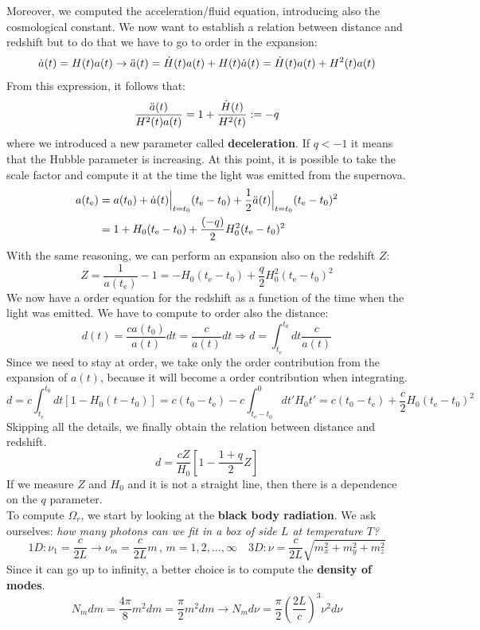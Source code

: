 \documentclass[10.75pt,a4paper,openright,bottom=2cm]{article}
\begin{document}
Moreover, we computed the acceleration/fluid equation, introducing also the cosmological constant. We now want to establish a relation between distance and redshift but to do that we have to go to  order in the expansion:
\[
\Dot{a}(t)=H(t)a(t)\to\Ddot{a}(t)=\Dot{H}(t)a(t)+H(t)\Dot{a}(t)=\Dot{H}(t)a(t)+H^2(t)a(t)
\]
From this expression, it follows that:
\[
\frac{\Ddot{a}(t)}{H^2(t)a(t)}=1+\frac{\Dot{H}(t)}{H^2(t)}:=-q
\]
where we introduced a new parameter called \textbf{deceleration}. If $q<-1$ it means that the Hubble parameter is increasing. At this point, it is possible to take the scale factor and compute it at the time the light was emitted from the supernova.
\[
\begin{aligned}
a(t_{\text{e}})&=a(t_0)+\Dot{a}(t)\Bigr|_{\substack{t=t_0}}(t_{\text{e}}-t_0)+\frac{1}{2}\Ddot{a}(t)\Bigr|_{\substack{t=t_0}}(t_{\text{e}}-t_0)^2\\
&=1+H_0(t_{\text{e}}-t_0)+\frac{(-q)}{2}H_0^2(t_{\text{e}}-t_0)^2
\end{aligned}
\]
With the same reasoning, we can perform an expansion also on the redshift $Z$:
\[
Z=\frac{1}{a(t_{\text{e}})}-1=-H_0(t_{\text{e}}-t_0)+\frac{q}{2}H_0^2(t_{\text{e}}-t_0)^2
\]
We now have a  order equation for the redshift as a function of the time when the light was emitted. We have to compute to  order also the distance:
\[
d(t)=\frac{ca(t_0)}{a(t)}dt=\frac{c}{a(t)}dt\Rightarrow d=\int_{t_{\text{e}}}^{t_0}dt\frac{c}{a(t)}
\]
Since we need to stay at  order, we take only the  order contribution from the expansion of $a(t)$, because it will become a  order contribution when integrating.
\[
d=c\int_{t_{\text{e}}}^{t_0}dt[1-H_0(t-t_0)]=c(t_0-t_{\text{e}})-c\int_{t_{\text{e}}-t_0}^{0}dt'H_0t'=c(t_0-t_{\text{e}})+\frac{c}{2}H_0(t_{\text{e}}-t_0)^2
\]
Skipping all the details, we finally obtain the relation between distance and redshift.
\[
d=\frac{cZ}{H_0}\left[1-\frac{1+q}{2}Z\right]
\]
If we measure $Z$ and $H_0$ and it is not a straight line, then there is a dependence on the $q$ parameter.\\
To compute $\Omega_r$, we start by looking at the \textbf{black body radiation}. We ask ourselves: \textit{how many photons can we fit in a box of side $L$ at temperature $T$?}
\[
1D: \nu_1=\frac{c}{2L}\to\nu_m=\frac{c}{2L}m\,,\,m=1,2,\dots,\infty \quad 3D: \nu=\frac{c}{2L}\sqrt{m_x^2+m_y^2+m_z^2}
\]
Since it can go up to infinity, a better choice is to compute the \textbf{density of modes}.
\[
N_mdm=\frac{4\pi}{8}m^2dm=\frac{\pi}{2}m^2dm\to N_md\nu=\frac{\pi}{2}\left(\frac{2L}{c}\right)^3\nu^2d\nu
\]
\end{document}
